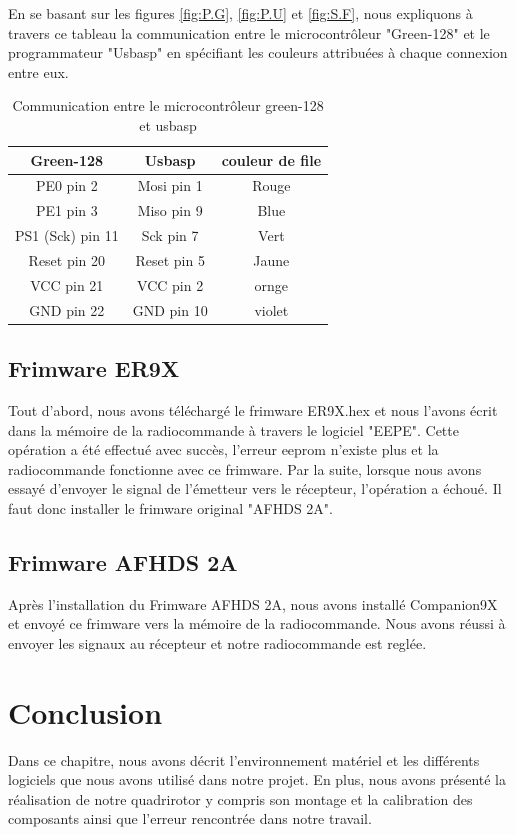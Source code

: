	
	
	En se basant sur les figures \ref{fig:P.G}, \ref{fig:P.U} et \ref{fig:S.F}, nous expliquons à travers ce tableau la communication entre le microcontrôleur "Green-128" et le programmateur "Usbasp" en spécifiant les couleurs attribuées à chaque connexion entre eux.
	
	\begin{table}[H]
		\begin{center}
			\caption{Communication entre le microcontrôleur green-128 et usbasp }
			\begin{tabular}{|c|c|c|}
				\hline
				\centering
				Green-128 &	Usbasp & couleur de file \\
				\hline
				PE0 pin 2 & Mosi pin 1 & Rouge  \\
				\hline
				PE1 pin 3 & Miso pin 9 & Blue  \\
				\hline
				PS1 (Sck)  pin 11 & Sck pin 7 & Vert  \\
				\hline
				Reset pin 20 & Reset pin 5 & Jaune \\
				\hline
				VCC pin 21 & VCC pin 2 &  ornge \\
				\hline
				GND pin 22 & GND pin 10 & violet \\
				\hline
			\end{tabular}
		\end{center}
	\end{table}
	\subsection{Frimware ER9X}
	Tout d'abord, nous avons téléchargé le frimware ER9X.hex et nous l'avons écrit dans la mémoire de la radiocommande à travers le logiciel "EEPE". Cette opération a été effectué avec succès, l'erreur eeprom n'existe plus et la radiocommande fonctionne avec ce frimware. Par la suite, lorsque nous avons essayé d'envoyer le signal de l'émetteur vers le récepteur, l'opération a échoué. Il faut donc installer le frimware original "AFHDS 2A".
	\subsection{Frimware AFHDS 2A}
	Après l'installation du Frimware AFHDS 2A, nous avons installé Companion9X et envoyé ce frimware vers la mémoire de la radiocommande. Nous avons réussi à envoyer les signaux au récepteur et notre radiocommande est reglée.
	
	
 
	\section*{Conclusion}
	Dans ce chapitre, nous avons décrit l'environnement matériel et les différents logiciels que nous avons utilisé dans notre projet. En plus, nous avons présenté la réalisation de notre quadrirotor y compris son montage et la calibration des composants ainsi que l'erreur rencontrée dans notre travail.


